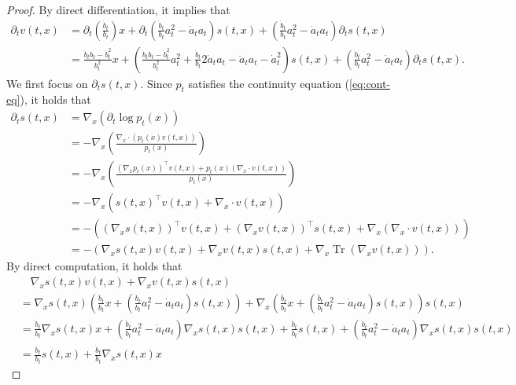\documentclass[twoside,11pt]{article}
\DeclareMathOperator{\Tr}{Tr}
\def\paref#1{(\ref{#1})}
\numberwithin{equation}{section}
\begin{document}
\begin{proof}
By direct differentiation, it implies that
\begin{align*}
    \partial_t v(t, x)
    &= \partial_t \left( \frac{\dot{b}_t}{b_t} \right) x + \partial_t \left( \frac{\dot{b}_t}{b_t} a_t^2 - \dot{a}_t a_t \right) s(t, x) + \left( \frac{\dot{b}_t}{b_t} a_t^2 - \dot{a}_t a_t \right) \partial_t s(t, x) \\
    &= \frac{\ddot{b}_tb_t - \dot{b}_t^2}{b_t^2} x + \left( \frac{\ddot{b}_tb_t - \dot{b}_t^2}{b_t^2} a_t^2 + \frac{\dot{b}_t}{b_t} 2 \dot{a}_t a_t - \ddot{a}_t a_t - \dot{a}_t^2 \right) s(t, x) + \left( \frac{\dot{b}_t}{b_t} a_t^2 - \dot{a}_t a_t \right) \partial_t s(t, x).
\end{align*}
We first focus on $\partial_t s(t, x)$. Since $p_t$ satisfies the continuity equation \paref{eq:cont-eq}, it holds that
\begin{align*}
    \partial_t s(t, x)
    &= \nabla_x (\partial_t \log p_t(x)) \\
    &= - \nabla_x \left( \frac{\nabla_x \cdot (p_t(x) v(t, x))}{p_t(x)} \right) \\
    &= - \nabla_x \left( \frac{(\nabla_x p_t(x))^{\top} v(t, x) + p_t(x) (\nabla_x \cdot v(t, x))}{p_t(x)} \right) \\
    &= - \nabla_x \left( s(t, x)^{\top} v(t, x) + \nabla_x \cdot v(t, x) \right) \\
    &= - \left( (\nabla_x s(t, x))^{\top} v(t, x) + (\nabla_x v(t, x))^{\top} s(t, x) + \nabla_x (\nabla_x \cdot v(t, x)) \right) \\
    &= - \left( \nabla_x s(t, x) v(t, x) + \nabla_x v(t, x) s(t, x) + \nabla_x \Tr( \nabla_x v(t, x) ) \right).
\end{align*}
By direct computation, it holds that
\begin{align*}
    & \quad \nabla_x s(t, x) v(t, x) + \nabla_x v(t, x) s(t, x) \\
    &= \nabla_x s(t, x) \left( \frac{\dot{b}_t}{b_t} x + \left( \frac{\dot{b}_t}{b_t} a_t^2 - \dot{a}_t a_t \right) s(t, x) \right)
       + \nabla_x \left( \frac{\dot{b}_t}{b_t} x + \left( \frac{\dot{b}_t}{b_t} a_t^2 - \dot{a}_t a_t \right) s(t, x) \right) s(t, x) \\
    &= \frac{\dot{b}_t}{b_t} \nabla_x s(t, x) x + \left( \frac{\dot{b}_t}{b_t} a_t^2 - \dot{a}_t a_t \right) \nabla_x s(t, x) s(t, x)
       + \frac{\dot{b}_t}{b_t} s(t, x) + \left( \frac{\dot{b}_t}{b_t} a_t^2 - \dot{a}_t a_t \right) \nabla_x s(t, x) s(t, x) \\
    &= \frac{\dot{b}_t}{b_t} s(t, x) + \frac{\dot{b}_t}{b_t} \nabla_x s(t, x) x

\end{align*}
\end{proof}
\end{document}
